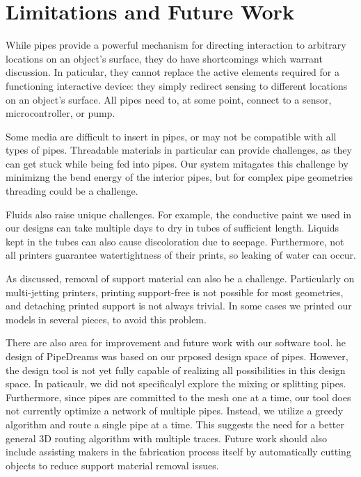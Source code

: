 \section{Limitations and Future Work}
While pipes provide a powerful mechanism for directing interaction to arbitrary locations on an object's surface, they do have shortcomings which warrant discussion.  In paticular, they cannot replace the active elements required for a functioning interactive device: they simply redirect sensing to different locations on an object's surface.  All pipes need to, at some point, connect to a sensor, microcontroller, or pump. 

Some media are difficult to insert in pipes, or may not be compatible with all types of pipes.  Threadable materials in particular can provide challenges, as they can get stuck while being fed into pipes. Our system mitagates this challenge by minimizng the bend energy of the interior pipes, but for complex pipe geometries threading could be a challenge. 

Fluids also raise unique challenges.  For example, the conductive paint we used in our designs can take multiple days to dry in tubes of sufficient length. Liquids kept in the tubes can also cause discoloration due to seepage.  Furthermore, not all printers guarantee watertightness of their prints, so leaking of water can occur.

As discussed, removal of support material can also be a challenge.  Particularly on multi-jetting printers, printing support-free is not possible for most geometries, and detaching printed support is not always trivial. In some cases we printed our models in several pieces, to avoid this problem. 

There are also area for improvement and future work with our software tool.  he design of PipeDreams was based on our prposed design space of pipes.  However, the design tool is not yet fully capable of realizing all possibilities in this design space.  In paticaulr, we did not specificalyl explore the mixing or splitting pipes.  Furthermore, since pipes are committed to the mesh one at a time, our tool does not currently optimize a network of multiple pipes. Instead, we utilize a greedy algorithm and route a single pipe at a time.  This suggests the need for a better general 3D routing algorithm with multiple traces.  Future work should also include assisting makers in the fabrication process itself by automatically cutting objects to reduce support material removal issues.  %

